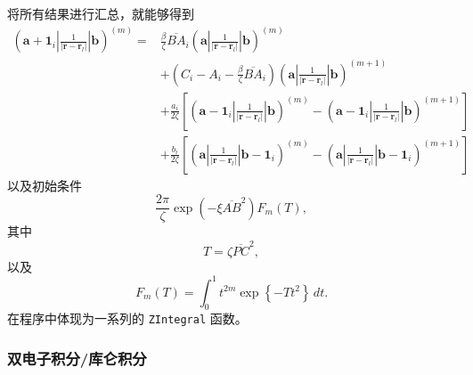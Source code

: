 \documentclass[12pt,a4paper,openany,twoside]{article}
\numberwithin{equation}{section}
\begin{document}
                将所有结果进行汇总，就能够得到
                \begin{equation}
                    \begin{aligned}
                    (\boldsymbol{a} + \boldsymbol{1}_i|\frac{1}{|\boldsymbol{r}-\boldsymbol{r}_l|}|\boldsymbol{b})^{(m)} =  & \frac{\beta}{\zeta} \overline{BA}_i (\boldsymbol{a}|\frac{1}{|\boldsymbol{r}-\boldsymbol{r}_l|}|\boldsymbol{b})^{(m)} \\
                    & + \left(C_i - A_i - \frac{\beta}{\zeta} \overline{BA}_i \right) (\boldsymbol{a}|\frac{1}{|\boldsymbol{r}-\boldsymbol{r}_l|}|\boldsymbol{b})^{(m+1)} \\
                    & + \frac{a_i}{2\zeta}\left[(\boldsymbol{a} - \boldsymbol{1}_i|\frac{1}{|\boldsymbol{r}-\boldsymbol{r}_l|}|\boldsymbol{b})^{(m)}- (\boldsymbol{a} - \boldsymbol{1}_i|\frac{1}{|\boldsymbol{r}-\boldsymbol{r}_l|}|\boldsymbol{b})^{(m+1)}\right] \\
                    & + \frac{b_i}{2\zeta}\left[(\boldsymbol{a}|\frac{1}{|\boldsymbol{r}-\boldsymbol{r}_l|}|\boldsymbol{b}- \boldsymbol{1}_i)^{(m)}- (\boldsymbol{a}|\frac{1}{|\boldsymbol{r}-\boldsymbol{r}_l|}|\boldsymbol{b} - \boldsymbol{1}_i)^{(m+1)}\right]
                    \end{aligned}
                \end{equation}
                以及初始条件
                \begin{equation}
                    \frac{2\pi}{\zeta} \exp\left(- \xi \overline{AB}^2\right) F_m(T),
                \end{equation}
                其中
                \begin{equation}
                    T = \zeta \overline{PC}^2
                ,\end{equation}
                以及
                \begin{equation}
                    F_m (T) = \int ^1_0 t^{2m} \exp \left\{ - T t^2 \right\}  \, dt 
                .\end{equation}
                在程序中体现为一系列的 \lstinline$ZIntegral$ 函数。


                \subsubsection{双电子积分/库仑积分}
            
\end{document}
